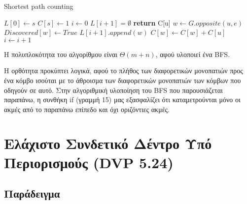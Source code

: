 \documentclass[a4paper,11pt]{article}
\begin{document}
\begin{algorithm}[H]
\caption{Shortest path counting}
\begin{algorithmic}[1]
\State $L[0] \gets s$
\State $C[s] \gets 1$
\State $i \gets 0$
    \State $L[i+1] = \emptyset$
	    \State \textbf{return} C[u]
	\EndIf
	    \State $w \gets G.opposite(u,e)$
		\State $Discovered[w] \gets True$
		\State $L[i+1].append(w)$
	    \EndIf
		\State $C[w] \gets C[w]+C[u]$
	    \EndIf
	\EndFor
    \EndFor
    \State $i \gets i+1$
\EndWhile
\EndProcedure
\end{algorithmic}
\end{algorithm}

Η πολυπλοκότητα του αλγορίθμου είναι $\Theta(m + n)$, αφού υλοποιεί ένα BFS.

Η ορθότητα προκύπτει λογικά, αφού το πλήθος των διαφορετικών μονοπατιών προς
ένα κόμβο ισούται με το άθροισμα των διαφορετικών μονοπατιών των κόμβων που
οδηγούν σε αυτό. Στην αλγοριθμική υλοποίηση του BFS που παρουσιάζεται
παραπάνω, η συνθήκη if (γραμμή 15) μας εξασφαλίζει ότι καταμετρούνται μόνο οι
ακμές από το παραπάνω επίπεδο και όχι οριζόντιες ακμές.

\section{Ελάχιστο Συνδετικό Δέντρο Υπό Περιορισμούς (DVP 5.24)}
\subsection{Παράδειγμα}

\begin{figure}[ht]
    \centering
\hspace{1cm}
\hspace{1cm}
\end{figure}
\end{document}
